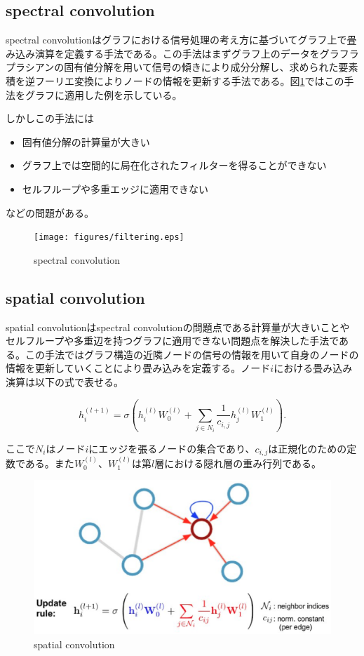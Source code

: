 \subsection{spectral convolution}
spectral convolution\cite{bruna2013spectral}はグラフにおける信号処理の考え方\cite{Shuman2013signal_processing_graph}に基づいてグラフ上で畳み込み演算を定義する手法である。この手法はまずグラフ上のデータをグラフラプラシアンの固有値分解を用いて信号の傾きにより成分分解し、求められた要素積を逆フーリエ変換によりノードの情報を更新する手法である。図\ref{fig:spectral}ではこの手法をグラフに適用した例を示している。

しかしこの手法には
\begin{itemize}
	\item 固有値分解の計算量が大きい
	\item グラフ上では空間的に局在化されたフィルターを得ることができない
    \item セルフループや多重エッジに適用できない
\end{itemize}
などの問題がある。

\vspace{1cm}

\begin{figure}[tb]
  \centering
  \texttt{[image: figures/filtering.eps]}
  \caption{spectral convolution\cite{bruna2013spectral}}
  \label{fig:spectral}
\end{figure}

\subsection{spatial convolution}

spatial convolution\cite{gilmer2017neural}はspectral convolutionの問題点である計算量が大きいことやセルフループや多重辺を持つグラフに適用できない問題点を解決した手法である。この手法ではグラフ構造の近隣ノードの信号の情報を用いて自身のノードの情報を更新していくことにより畳み込みを定義する。ノード$i$における畳み込み演算は以下の式で表せる。

\begin{equation}
\displaystyle h^{(l+1)}_i = \sigma \left(h^{(l)}_i W^{(l)}_0 + \sum_{j \in {N_i}} \frac{1}{c_{i, j}} h^{(l)}_j W^{(l)}_1  \right).
\end{equation}

ここで$N_i$はノード$i$にエッジを張るノードの集合であり、$c_{i,j}$は正規化のための定数である。また$W^{(l)}_0$、$W^{(l)}_1$は第$l$層における隠れ層の重み行列である。

\begin{figure}[tb]
  \centering
  \includegraphics[width=0.7\hsize]{figures/spatial.eps}
  \caption{spatial convolution\cite{kipf2016GCN}}
  \label{fig:spatial}
\end{figure}

